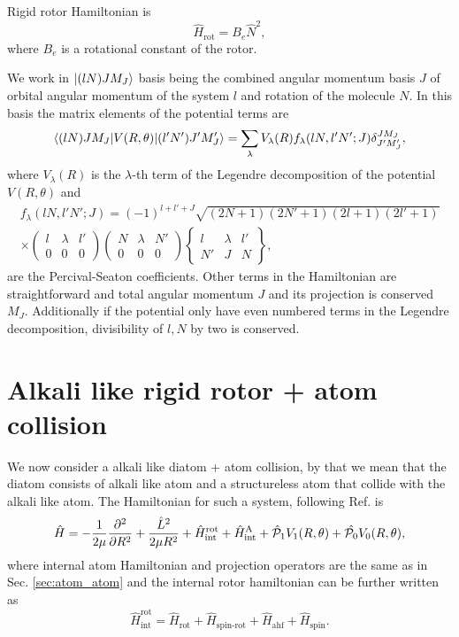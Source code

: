 \documentclass[a4paper]{article}
\newcommand{\threejm}[6]{ \left(\begin{array}{ccc} #1 & #3 & #5\\
    #2 & #4 & #6
\end{array}
\right)}
\newcommand{\sixj}[6]{ \left\{\begin{array}{ccc} #1 & #3 & #5\\
    #2 & #4 & #6
\end{array}
\right\}}
\begin{document}
    Rigid rotor Hamiltonian is
    \begin{equation}
        \hat{H}_\text{rot} = B_e \hat{N}^2,
    \end{equation}
    where \(B_e\) is a rotational constant of the rotor.

    We work in \(\ket{(lN)J M_J}\) basis being the combined angular momentum basis \(J\) of orbital angular momentum of the system
    \(l\) and rotation of the molecule \(N\).
    In this basis the matrix elements of the potential terms are
    \begin{equation}
        \braket{(lN)J M_J |V(R, \theta)| (l'N')J' M'_J} = \sum_\lambda V_\lambda(R) f_\lambda(lN, l'N'; J) \delta^{JM_J}_{J'M'_J},
    \end{equation}
    where $V_\lambda(R)$ is the $\lambda$-th term of the Legendre decomposition of the potential $V(R, \theta)$
    and
    \begin{multline}
        f_\lambda(lN, l'N'; J) = (-1)^{l + l' + J} \sqrt{(2N + 1)(2N' + 1)(2l + 1)(2l' + 1)} \\
            \times \threejm{l}{0}{\lambda}{0}{l'}{0} \threejm{N}{0}{\lambda}{0}{N'}{0} \sixj{l}{N'}{\lambda}{J}{l'}{N},
    \end{multline}
    are the Percival-Seaton coefficients.
    Other terms in the Hamiltonian are straightforward and total angular momentum \(J\) 
    and its projection is conserved \(M_J\).
    Additionally if the potential only have even numbered terms in the Legendre decomposition,
    divisibility of \(l, N\) by two is conserved.

\section{Alkali like rigid rotor + atom collision}
    We now consider a alkali like diatom + atom collision, by that we mean
    that the diatom consists of alkali like atom and a structureless atom that collide with the alkali like atom.
    The Hamiltonian for such a system, following Ref. \cite{tscherbul2023ultracold} is
    \begin{equation}
        \hat{H} = -\frac{1}{2\mu}\pdv[order=2]{}{R} + \frac{\hat{L}^2}{2\mu R^2} 
            + \hat{H}^\text{rot}_\text{int} + \hat{H}^\text{A}_\text{int} 
            + \hat{\mathcal{P}}_1 V_1(R, \theta) + \hat{\mathcal{P}_0} V_0(R, \theta),
    \end{equation}
    where internal atom Hamiltonian and projection operators are the same as in Sec. \ref{sec:atom_atom}
    and the internal rotor hamiltonian can be further written as
    \begin{equation}
        \hat{H}^\text{rot}_\text{int} = \hat{H}_\text{rot} + \hat{H}_\text{spin-rot} 
            + \hat{H}_\text{ahf} + \hat{H}_\text{spin}.
    \end{equation}
\end{document}
